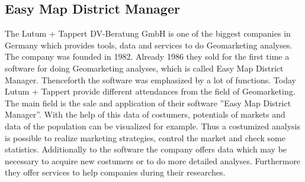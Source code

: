 \subsection{Easy Map District Manager}
The Lutum + Tappert DV-Beratung GmbH is one of the biggest companies in Germany which provides tools, data and services to do Geomarketing analyses. The company was founded in 1982. Already 1986 they sold for the first time a software for doing Geomarketing analyses, which is called Easy Map District Manager. Thenceforth the software was emphasized by a lot of functions. Today Lutum + Tappert provide different attendances from the field of Geomarketing. The main field is the sale and application of their software ''Easy Map District Manager''. With the help of this data of costumers, potentials of markets and data of the population can be visualized for example. Thus a costumized analysis is possible to realize marketing strategies, control the market and check some statistics. Additionally to the software the company offers data which may be necessary to acquire new costumers or to do more detailed analyses. Furthermore they offer services to help companies during their researches. \\
